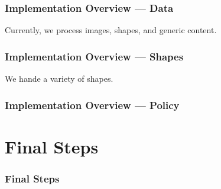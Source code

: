 \documentclass[t,handout, 10pt]{beamer}
\begin{document}
\begin{frame}
\frametitle{Implementation Overview --- Data}
Currently, we process images, shapes, and generic content.
\par\noindent
\begin{minipage}[t]{.30\textwidth}

\end{minipage}
\hfill
\begin{minipage}[t]{.30\textwidth}

\end{minipage}
\hfill
\begin{minipage}[t]{.30\textwidth}

\end{minipage}
\end{frame}

\begin{frame}
\frametitle{Implementation Overview --- Shapes}
We hande a variety of shapes.
\par\noindent
\begin{minipage}[t]{.30\textwidth}

\end{minipage}
\hfill
\begin{minipage}[t]{.30\textwidth}

\end{minipage}
\hfill
\begin{minipage}[t]{.30\textwidth}

\end{minipage}
\end{frame}

\begin{frame}
\frametitle{Implementation Overview --- Policy}

\end{frame}

\section{Final Steps}
\begin{frame}
\frametitle{Final Steps}
\end{frame}
\end{document}
